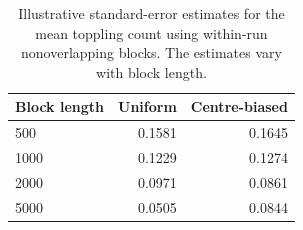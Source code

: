 \begin{table}[htbp]
\centering
\caption{Illustrative standard-error estimates for the mean toppling count using within-run nonoverlapping blocks. The estimates vary with block length.}
\label{tab:blocks}
\begin{tabular}{@{}lrr@{}}
\toprule
Block length & Uniform & Centre-biased\\
\midrule
500 & 0.1581 & 0.1645\\
1000 & 0.1229 & 0.1274\\
2000 & 0.0971 & 0.0861\\
5000 & 0.0505 & 0.0844\\
\bottomrule
\end{tabular}
\end{table}
